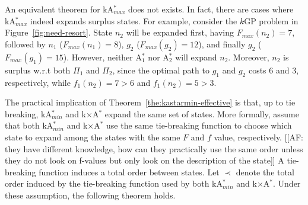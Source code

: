 \documentclass{aicom2e}
\newcommand{\kgs}{$k$GP}
\newcommand{\kastarmin}{kA$^*_{min}$}
\newcommand{\kastarmax}{kA$^*_{max}$}
\newcommand{\kxastar}{k$\times$A$^*$}
\newcommand{\astari}[1]{A$^*_#1$}
\begin{document}
An equivalent theorem for \kastarmax{} does not exists. In fact, there are
cases where \kastarmax{} indeed expands surplus states. For example, consider
the \kgs{} problem in Figure~\ref{fig:need-resort}. State $n_2$ will be
expanded first, having $F_{max}(n_2)=7$, followed by $n_1$ ($F_{max}(n_1)=8$),
$g_2$ ($F_{max}(g_2)=12$), and finally $g_2$ ($F_{max}(g_1)=15$). However,
neither \astari{1} nor \astari{2} will expand $n_2$. Moreover, $n_2$ is surplus
w.r.t both $\Pi_1$ and $\Pi_2$, since the optimal path to $g_1$ and $g_2$ costs
6 and 3, respectively, while $f_1(n_2)=7>6$ and $f_1(n_2)=5>3$.


The practical implication of Theorem~\ref{the:kastarmin-effective} is that, up
to tie breaking, \kastarmin{} and \kxastar{} expand the same set of states.
More formally, assume that both \kastarmin{} and \kxastar{} use the same
tie-breaking function to choose which state to expand among the states with the
same $F$ and $f$ value, respectively. [[AF: they have different knowledge, how
can they practically use the same order unless they do not look on f-values but
only look on the description of the state]] A tie-breaking function induces a
total order between states. Let $\prec$ denote the total order induced by the
tie-breaking function used by both \kastarmin{} and \kxastar{}. Under these
assumption, the following theorem holds.
\end{document}
